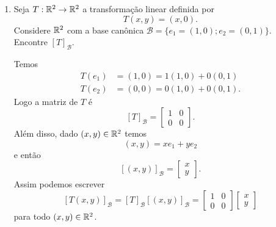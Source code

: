 \begin{exemplos}
	\begin{enumerate}[label={\arabic*})]
		\item Seja $T : \mathbb{R}^2 \to \mathbb{R}^2$ a transforma\c{c}\~ao linear definida por
		\[
			T(x,y) = (x,0).
		\]
		Considere $\mathbb{R}^2$ com a base can\^onica $\mathcal{B} = \{e_1=(1,0);e_2=(0,1)\}$. Encontre $[T]_\mathcal{B}$.
		\begin{solucao}
			Temos
			\begin{align*}
				T(e_1) &= (1,0) = 1(1,0) + 0(0,1)\\
				T(e_2) &= (0,0) = 0(1,0) + 0(0,1).
			\end{align*}
			Logo a matriz de $T$ \'e
			\[
				[T]_\mathcal{B} = \begin{bmatrix}
					1 & 0\\
					0 & 0
				\end{bmatrix}.
			\]
			Al\'em disso, dado $(x,y) \in \mathbb{R}^2$ temos
			\[
				(x,y) = xe_1 + ye_2
			\]
			e ent\~ao
			\[
				[(x,y)]_\mathcal{B} = \begin{bmatrix}
					x\\y
				\end{bmatrix}.
			\]
			Assim podemos escrever
			\[
				[T(x,y)]_\mathcal{B} = [T]_\mathcal{B}[(x,y)]_\mathcal{B} = \begin{bmatrix}
					1 & 0\\
					0 & 0
				\end{bmatrix}\begin{bmatrix}
					x\\y
				\end{bmatrix}
			\]
			para todo $(x,y) \in \mathbb{R}^2$.
		\end{solucao}


\end{enumerate}
\end{exemplos}
